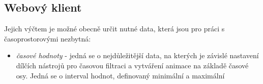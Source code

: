\newpage
\subsection{Webový klient}

Jejich výčtem je možné obecně určit nutné data, která jsou pro práci s časoprostorovými nezbytná:

\begin{itemize}
	\item \textit{časové hodnoty} - jedná se o nejdůležitější data, na kterých je závislé nastavení dílčích nástrojů pro časovou filtraci a vytváření animace na základě časové osy. Jedná se o interval hodnot, definovaný minimální a maximální
\end{itemize}



